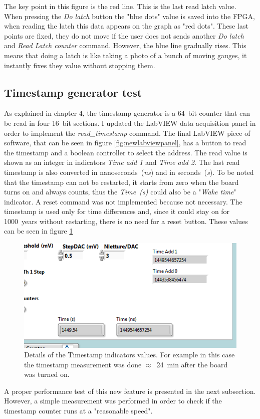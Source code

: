 The key point in this figure is the red line. This is the last read latch value.
When pressing the \textit{Do latch} button the "blue dots" value is saved into the FPGA, when reading the latch this data appears on the graph as "red dots".
These last points are fixed, they do not move if the user does not sends another \textit{Do latch} and \textit{Read Latch counter} command. However, the blue line gradually rises.
This means that doing a latch is like taking a photo of a bunch of moving gauges, it instantly fixes they value without stopping them.  
\subsection{Timestamp generator test}
\noindent As explained in chapter 4, the timestamp generator is a 64~bit counter that can be read in four 16~bit sections.
I updated the LabVIEW data acquisition panel in order to implement the \textit{read\_timestamp} command.
The final LabVIEW piece of software, that can be seen in figure \ref{fig:newlabviewpanel}, has a button to read the timestamp and a boolean controller to select the address.
The read value is shown as an integer in indicators \textit{Time add 1} and \textit{Time add 2}. The last read timestamp is also converted in nanoseconds~(\textit{ns}) and in seconds~(\textit{s}).
To be noted that the timestamp can not be restarted, it starts from zero when the board turns on and always counts, thus the \textit{Time~(s)} could also be a "\textit{Wake time}" indicator. A reset command was not implemented because not necessary. The timestamp is used only for time differences and, since it could stay on for 1000~years without restarting, there is no need for a reset button. 
These values can be seen in figure \ref{fig:timestampfigure}
\begin{figure}[H]
	\centering
	\includegraphics[width=0.5\linewidth]{IMG/ch5/latch_tests/fig15.PNG}
	\caption{Details of the Timestamp indicators values. For example in this case the timestamp measurement was done $\approx$~24~min after the board was turned on.}
	\label{fig:timestampfigure}
\end{figure}
\noindent A proper performance test of this new feature is presented in the next subsection. However, a simple measurement was performed in order to check if the timestamp counter runs at a "reasonable speed".
